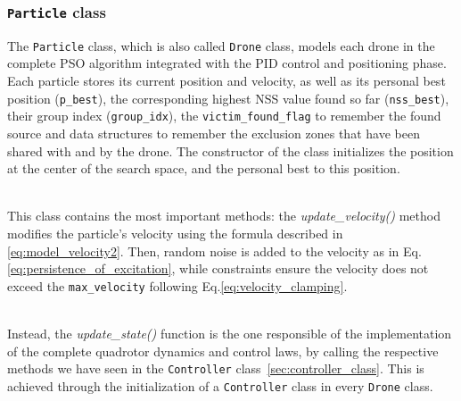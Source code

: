 \documentclass[main]{subfiles}
\begin{document}
\subsubsection{\texttt{Particle} class}
The \texttt{Particle} class, which is also called \texttt{Drone} 
class, models each drone in the complete PSO algorithm integrated with the PID
control and positioning phase. 
\noindent\\
Each particle stores its current 
position and velocity, as well as its personal 
best position (\texttt{p\_best}), the corresponding
highest NSS value found so far (\texttt{nss\_best}), 
their group index (\texttt{group\_idx}), 
the \texttt{victim\_found\_flag} to remember the found source and 
data structures to remember the exclusion zones 
that have been shared with and by the drone.
The constructor of the class initializes the position 
at the center of the search space, and the personal best
to this position.

\noindent\\
This class contains the most important 
methods: the \textit{update\_velocity()} method modifies the 
particle's velocity using the formula described
in \ref{eq:model_velocity2}. Then, random noise is 
added to the velocity as in Eq.\ref{eq:persistence_of_excitation},
while constraints ensure the velocity does not 
exceed the \texttt{max\_velocity} following Eq.\ref{eq:velocity_clamping}.

\noindent\\
Instead, the \textit{update\_state()} function is the one responsible
of the implementation of the complete quadrotor dynamics
and control laws, by calling the respective methods we have seen 
in the \texttt{Controller} class~\ref{sec:controller_class}.
This is achieved through the initialization of a \texttt{Controller}
class in every \texttt{Drone} class.
\end{document}
